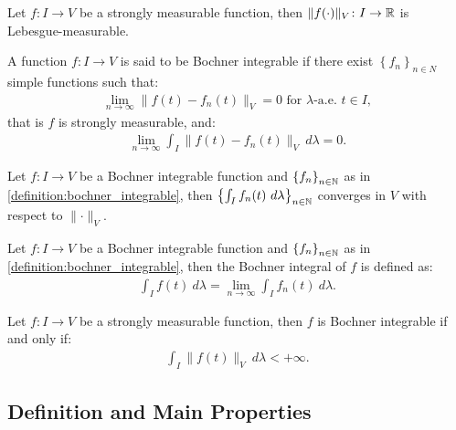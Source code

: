 \begin{lemma}
    Let $f\colon I \rightarrow V$ be a strongly measurable function, then $\lVert f(\cdot) \rVert_V \colon I \rightarrow \mathbb{R}$ is Lebesgue-measurable.
\end{lemma}

\begin{definition} \label{definition:bochner_integrable}
    A function $f\colon I \rightarrow V$ is said to be Bochner integrable if there exist $\left\{ f_n \right\}_{n \in N}$ simple functions such that:
    \begin{gather}
        \lim_{n \rightarrow \infty} \lVert f(t) - f_n(t) \rVert_V = 0 \text{ for } \lambda \text{-a.e. } t \in I,
    \end{gather}
    that is  $f$ is strongly measurable, and:
    \begin{gather}
        \lim_{n \rightarrow \infty} \int_I \lVert f(t) - f_n(t) \rVert_V ~ d \lambda = 0.
    \end{gather}
\end{definition}

\begin{lemma}
    Let $f\colon I \rightarrow V$ be a Bochner integrable function and $\left\{ f_n \right\}_{n \in \mathbb{N}}$ as in \ref{definition:bochner_integrable}, then $\left\{ \int_I f_n(t) ~ d \lambda \right\}_{n \in \mathbb{N}}$ converges in $V$ with respect to $\lVert \cdot \rVert_V$.
\end{lemma}

\begin{definition}
    Let $f\colon I \rightarrow V$ be a Bochner integrable function and $\left\{ f_n \right\}_{n \in \mathbb{N}}$ as in \ref{definition:bochner_integrable}, then the Bochner integral of $f$ is defined as:
    \begin{gather}
        \int_I f(t) ~ d \lambda = \lim_{n \rightarrow \infty} \int_I f_n(t) ~ d \lambda.
    \end{gather}
\end{definition}

\begin{theorem}[Bochner]
    Let $f\colon I \rightarrow V$ be a strongly measurable function, then $f$ is Bochner integrable if and only if:
    \begin{gather}
        \int_I \lVert f(t) \rVert_V ~ d \lambda < + \infty.
    \end{gather}
\end{theorem}

\subsection{Definition and Main Properties}

